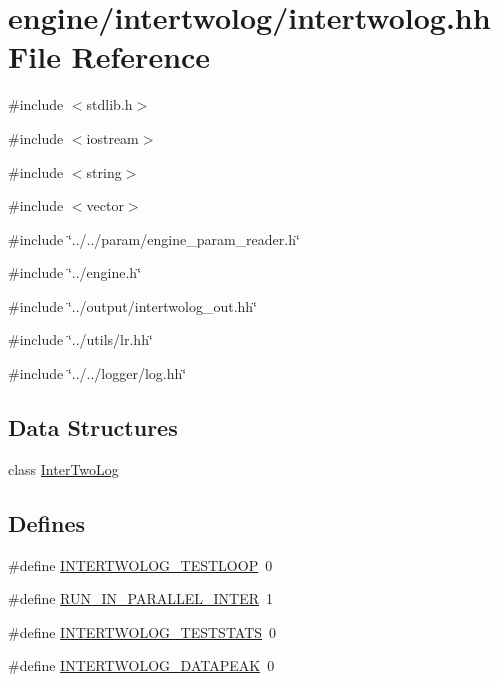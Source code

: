 \hypertarget{intertwolog_8hh}{
\section{engine/intertwolog/intertwolog.hh File Reference}
\label{intertwolog_8hh}
}
{\ttfamily \#include $<$stdlib.h$>$}\par
{\ttfamily \#include $<$iostream$>$}\par
{\ttfamily \#include $<$string$>$}\par
{\ttfamily \#include $<$vector$>$}\par
{\ttfamily \#include \char`\"{}../../param/engine\_\-param\_\-reader.h\char`\"{}}\par
{\ttfamily \#include \char`\"{}../engine.h\char`\"{}}\par
{\ttfamily \#include \char`\"{}../output/intertwolog\_\-out.hh\char`\"{}}\par
{\ttfamily \#include \char`\"{}../utils/lr.hh\char`\"{}}\par
{\ttfamily \#include \char`\"{}../../logger/log.hh\char`\"{}}\par
\subsection*{Data Structures}
\begin{DoxyCompactItemize}
\item 
class \hyperlink{classInterTwoLog}{InterTwoLog}
\end{DoxyCompactItemize}
\subsection*{Defines}
\begin{DoxyCompactItemize}
\item 
\#define \hyperlink{intertwolog_8hh_a1c4f16246cf6aeda894aa254f41ccee4}{INTERTWOLOG\_\-TESTLOOP}~0
\item 
\#define \hyperlink{intertwolog_8hh_a336c9bf74cfeaaa050b253599b678c10}{RUN\_\-IN\_\-PARALLEL\_\-INTER}~1
\item 
\#define \hyperlink{intertwolog_8hh_acdfd99a66717dca63b6b480516e141c1}{INTERTWOLOG\_\-TESTSTATS}~0
\item 
\#define \hyperlink{intertwolog_8hh_af8fa7582dfcbc23a5cc0ada82cecdeb9}{INTERTWOLOG\_\-DATAPEAK}~0
\end{DoxyCompactItemize}


